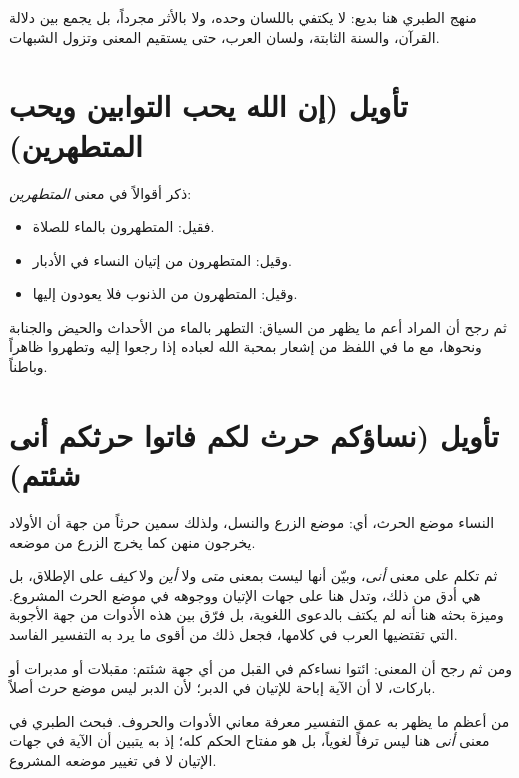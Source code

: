 \begin{fawaid}
منهج الطبري هنا بديع: لا يكتفي باللسان وحده، ولا بالأثر مجرداً، بل يجمع بين دلالة القرآن، والسنة الثابتة، ولسان العرب، حتى يستقيم المعنى وتزول الشبهات.
\end{fawaid}

\section{تأويل (إن الله يحب التوابين ويحب المتطهرين)}
ذكر  أقوالاً في معنى \textit{المتطهرين}:
\begin{itemize}
    \item فقيل: المتطهرون بالماء للصلاة.
    \item وقيل: المتطهرون من إتيان النساء في الأدبار.
    \item وقيل: المتطهرون من الذنوب فلا يعودون إليها.
\end{itemize}

ثم رجح أن المراد أعم ما يظهر من السياق: التطهر بالماء من الأحداث والحيض والجنابة ونحوها، مع ما في اللفظ من إشعار بمحبة الله لعباده إذا رجعوا إليه وتطهروا ظاهراً وباطناً.

\separator

\section{تأويل (نساؤكم حرث لكم فاتوا حرثكم أنى شئتم)}
 النساء موضع الحرث، أي: موضع الزرع والنسل، ولذلك سمين حرثاً من جهة أن الأولاد يخرجون منهن كما يخرج الزرع من موضعه.

ثم تكلم  على معنى \textit{أنى}، وبيّن أنها ليست بمعنى \textit{متى} ولا \textit{أين} ولا \textit{كيف} على الإطلاق، بل هي أدق من ذلك، وتدل هنا على جهات الإتيان ووجوهه في موضع الحرث المشروع. وميزة بحثه هنا أنه لم يكتف بالدعوى اللغوية، بل فرّق بين هذه الأدوات من جهة الأجوبة التي تقتضيها العرب في كلامها، فجعل ذلك من أقوى ما يرد به التفسير الفاسد.

ومن ثم رجح أن المعنى: ائتوا نساءكم في القبل من أي جهة شئتم: مقبلات أو مدبرات أو باركات، لا أن الآية إباحة للإتيان في الدبر؛ لأن الدبر ليس موضع حرث أصلاً.

\begin{fawaid}
من أعظم ما يظهر به عمق التفسير معرفة معاني الأدوات والحروف. فبحث الطبري في معنى \textit{أنى} هنا ليس ترفاً لغوياً، بل هو مفتاح الحكم كله؛ إذ به يتبين أن الآية في جهات الإتيان لا في تغيير موضعه المشروع.
\end{fawaid}

